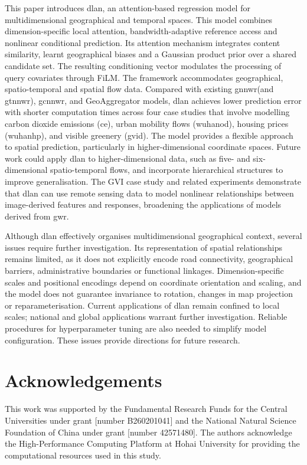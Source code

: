 \documentclass[]{interact}
\newif\ifanonymous
\newcommand{\DLAN}{\gls{dlan}\xspace}
\newcommand{\GNNWR}{\gls{gnnwr}\xspace}
\newcommand{\GTNNWR}{\gls{gtnnwr}\xspace}
\newcommand{\GCNNWR}{\gls{gcnnwr}\xspace}
\newcommand{\GAgg}{GeoAggregator\xspace}
\newcommand{\COO}{\gls{ce}\xspace}
\newcommand{\WuhanOD}{\gls{wuhanod}\xspace}
\newcommand{\WuhanHP}{\gls{wuhanhp}\xspace}
\newcommand{\GVI}{\gls{gvid}\xspace}
\begin{document}
This paper introduces \DLAN, an attention-based regression model for multidimensional geographical and temporal spaces.
This model combines dimension-specific local attention,
bandwidth-adaptive reference access and nonlinear conditional prediction.
Its attention mechanism integrates content similarity, learnt geographical biases and a Gaussian product prior over a shared candidate set.
The resulting conditioning vector modulates the processing of query covariates through FiLM.
The framework accommodates geographical, spatio-temporal and spatial flow data.
Compared with existing \GNNWR (and \GTNNWR), \GCNNWR, and \GAgg models, \DLAN achieves lower prediction error with shorter computation times across four case studies that involve modelling carbon dioxide emissions (\COO), urban mobility flows (\WuhanOD), housing prices (\WuhanHP), and visible greenery (\GVI).
The model provides a flexible approach to spatial prediction, particularly in higher-dimensional coordinate spaces.
Future work could apply \DLAN to higher-dimensional data, such as five- and six-dimensional spatio-temporal flows, and incorporate hierarchical structures to improve generalisation.
The GVI case study and related experiments demonstrate that \DLAN can use remote sensing data to model nonlinear relationships between image-derived features and responses, broadening the applications of models derived from \gls{gwr}.

Although \DLAN effectively organises multidimensional geographical context, several issues require further investigation.
Its representation of spatial relationships remains limited, as it does not explicitly encode road connectivity, geographical barriers, administrative boundaries or functional linkages.
Dimension-specific scales and positional encodings depend on coordinate orientation and scaling,
and the model does not guarantee invariance to rotation, changes in map projection or reparameterisation.
Current applications of \DLAN remain confined to local scales; national and global applications warrant further investigation.
Reliable procedures for hyperparameter tuning are also needed to simplify model configuration.
These issues provide directions for future research.

\ifanonymous
\else
\section*{Acknowledgements}

This work was supported by the Fundamental Research Funds for the Central Universities under grant [number B260201041] and the National Natural Science Foundation of China under grant [number 42571480].
The authors acknowledge the High-Performance Computing Platform at Hohai University for providing the computational resources used in this study.
\fi
\end{document}
